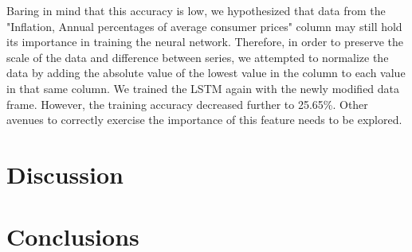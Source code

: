 \documentclass[12pt]{article}
\begin{document}
Baring in mind that this accuracy is low, we hypothesized that data from the "Inflation, Annual percentages of average consumer prices" column may still hold its importance in training the neural network. Therefore, in order to preserve the scale of the data and difference between series, we attempted to normalize the data by adding the absolute value of the lowest value in the column to each value in that same column. We trained the LSTM again with the newly modified data frame. However, the training accuracy decreased further to 25.65\%. Other avenues to correctly exercise the importance of this feature needs to be explored. 

\section{Discussion}

\section{Conclusions}



\printbibliography
\end{document}
